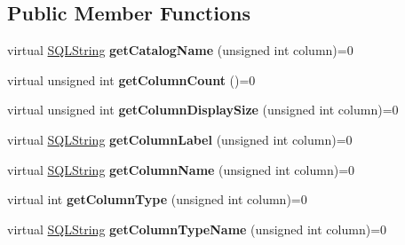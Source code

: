 \subsection*{Public Member Functions}
\begin{DoxyCompactItemize}
\item 
\hypertarget{classsql_1_1_result_set_meta_data_a3745a62f3ab253c6b2db8e3048d61ea6}{}\label{classsql_1_1_result_set_meta_data_a3745a62f3ab253c6b2db8e3048d61ea6} 
virtual \hyperlink{classsql_1_1_s_q_l_string}{S\+Q\+L\+String} {\bfseries get\+Catalog\+Name} (unsigned int column)=0
\item 
\hypertarget{classsql_1_1_result_set_meta_data_a328edb305a24e1e5dd3e4a697782b82c}{}\label{classsql_1_1_result_set_meta_data_a328edb305a24e1e5dd3e4a697782b82c} 
virtual unsigned int {\bfseries get\+Column\+Count} ()=0
\item 
\hypertarget{classsql_1_1_result_set_meta_data_a58a7eb6a9cdaf77a3b5ffe224dba24cb}{}\label{classsql_1_1_result_set_meta_data_a58a7eb6a9cdaf77a3b5ffe224dba24cb} 
virtual unsigned int {\bfseries get\+Column\+Display\+Size} (unsigned int column)=0
\item 
\hypertarget{classsql_1_1_result_set_meta_data_a52984c0eacd806dc3437bedfaee65c45}{}\label{classsql_1_1_result_set_meta_data_a52984c0eacd806dc3437bedfaee65c45} 
virtual \hyperlink{classsql_1_1_s_q_l_string}{S\+Q\+L\+String} {\bfseries get\+Column\+Label} (unsigned int column)=0
\item 
\hypertarget{classsql_1_1_result_set_meta_data_ac35bf5da5b776feaa75a3cfd02391487}{}\label{classsql_1_1_result_set_meta_data_ac35bf5da5b776feaa75a3cfd02391487} 
virtual \hyperlink{classsql_1_1_s_q_l_string}{S\+Q\+L\+String} {\bfseries get\+Column\+Name} (unsigned int column)=0
\item 
\hypertarget{classsql_1_1_result_set_meta_data_a6b21f1dde451b034d14af056b113aa44}{}\label{classsql_1_1_result_set_meta_data_a6b21f1dde451b034d14af056b113aa44} 
virtual int {\bfseries get\+Column\+Type} (unsigned int column)=0
\item 
\hypertarget{classsql_1_1_result_set_meta_data_aea3ff7c15f8daba8c33ca3ae0aa48c0d}{}\label{classsql_1_1_result_set_meta_data_aea3ff7c15f8daba8c33ca3ae0aa48c0d} 
virtual \hyperlink{classsql_1_1_s_q_l_string}{S\+Q\+L\+String} {\bfseries get\+Column\+Type\+Name} (unsigned int column)=0
\item 
\hypertarget{classsql_1_1_result_set_meta_data_a2a21f8576e320d35df12abeb588bb5f8}{}\label{classsql_1_1_result_set_meta_data_a2a21f8576e320d35df12abeb588bb5f8} 

\end{DoxyCompactItemize}
